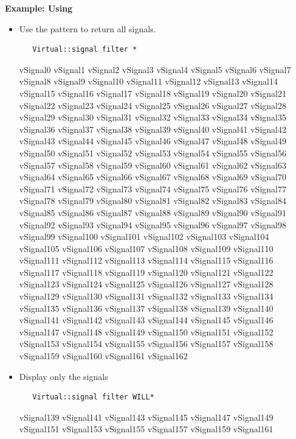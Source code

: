 {\bf Example: Using }
\begin{itemize}


\item Use the pattern \te{*} to return all signals.

\begin{verbatim}
   Virtual::signal filter *
\end{verbatim}

\begin{codebox}
vSignal0 vSignal1 vSignal2 vSignal3 vSignal4 vSignal5 vSignal6
vSignal7 vSignal8 vSignal9 vSignal10 vSignal11 vSignal12 vSignal13
vSignal14 vSignal15 vSignal16 vSignal17 vSignal18 vSignal19 vSignal20
vSignal21 vSignal22 vSignal23 vSignal24 vSignal25 vSignal26 vSignal27
vSignal28 vSignal29 vSignal30 vSignal31 vSignal32 vSignal33 vSignal34
vSignal35 vSignal36 vSignal37 vSignal38 vSignal39 vSignal40 vSignal41
vSignal42 vSignal43 vSignal44 vSignal45 vSignal46 vSignal47 vSignal48
vSignal49 vSignal50 vSignal51 vSignal52 vSignal53 vSignal54 vSignal55
vSignal56 vSignal57 vSignal58 vSignal59 vSignal60 vSignal61 vSignal62
vSignal63 vSignal64 vSignal65 vSignal66 vSignal67 vSignal68 vSignal69
vSignal70 vSignal71 vSignal72 vSignal73 vSignal74 vSignal75 vSignal76
vSignal77 vSignal78 vSignal79 vSignal80 vSignal81 vSignal82 vSignal83
vSignal84 vSignal85 vSignal86 vSignal87 vSignal88 vSignal89 vSignal90
vSignal91 vSignal92 vSignal93 vSignal94 vSignal95 vSignal96 vSignal97
vSignal98 vSignal99 vSignal100 vSignal101 vSignal102 vSignal103
vSignal104 vSignal105 vSignal106 vSignal107 vSignal108 vSignal109
vSignal110 vSignal111 vSignal112 vSignal113 vSignal114 vSignal115
vSignal116 vSignal117 vSignal118 vSignal119 vSignal120 vSignal121
vSignal122 vSignal123 vSignal124 vSignal125 vSignal126 vSignal127
vSignal128 vSignal129 vSignal130 vSignal131 vSignal132 vSignal133
vSignal134 vSignal135 vSignal136 vSignal137 vSignal138 vSignal139
vSignal140 vSignal141 vSignal142 vSignal143 vSignal144 vSignal145
vSignal146 vSignal147 vSignal148 vSignal149 vSignal150 vSignal151
vSignal152 vSignal153 vSignal154 vSignal155 vSignal156 vSignal157
vSignal158 vSignal159 vSignal160 vSignal161 vSignal162
\end{codebox}

\item Display only the  signals
\begin{verbatim}
   Virtual::signal filter WILL*
\end{verbatim}

\begin{codebox}
vSignal139 vSignal141 vSignal143 vSignal145 vSignal147 vSignal149
vSignal151 vSignal153 vSignal155 vSignal157 vSignal159 vSignal161 
\end{codebox}
\end{itemize}

